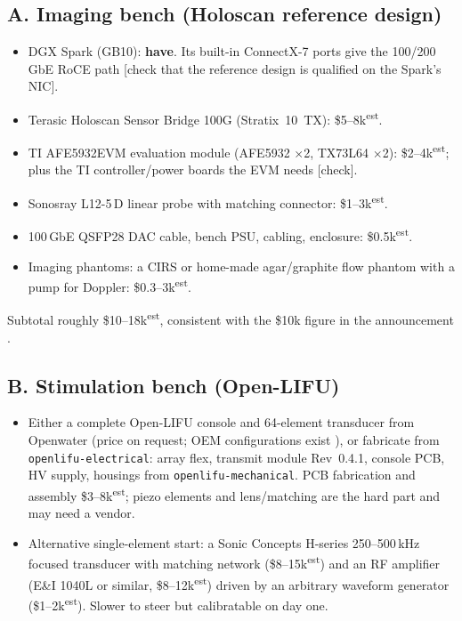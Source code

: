 \documentclass[11pt,a4paper]{article}
\newcommand{\todo}[1]{\textcolor{red!70!black}{[#1]}}
\newcommand{\est}{\textsuperscript{est}}
\begin{document}
\subsection*{A. Imaging bench (Holoscan reference design)}
\begin{itemize}[leftmargin=*,nosep]
\item DGX Spark (GB10): \textbf{have}. Its built-in ConnectX-7 ports give the 100/200\,GbE RoCE path \todo{check that the reference design is qualified on the Spark's NIC}.
\item Terasic Holoscan Sensor Bridge 100G (Stratix~10~TX): \$5--8k\est.
\item TI AFE5932EVM evaluation module (AFE5932 $\times$2, TX73L64 $\times$2): \$2--4k\est; plus the TI controller/power boards the EVM needs \todo{check}.
\item Sonosray L12-5\,D linear probe with matching connector: \$1--3k\est.
\item 100\,GbE QSFP28 DAC cable, bench PSU, cabling, enclosure: \$0.5k\est.
\item Imaging phantoms: a CIRS or home-made agar/graphite flow phantom with a pump for Doppler: \$0.3--3k\est.
\end{itemize}
Subtotal roughly \$10--18k\est, consistent with the \$10k figure in the announcement \cite{simson2026}.

\subsection*{B. Stimulation bench (Open-LIFU)}
\begin{itemize}[leftmargin=*,nosep]
\item Either a complete Open-LIFU console and 64-element transducer from Openwater (price on request; OEM configurations exist \cite{openlifu}), or fabricate from \texttt{openlifu-electrical}: array flex, transmit module Rev~0.4.1, console PCB, HV supply, housings from \texttt{openlifu-mechanical}. PCB fabrication and assembly \$3--8k\est; piezo elements and lens/matching are the hard part and may need a vendor.
\item Alternative single-element start: a Sonic Concepts H-series 250--500\,kHz focused transducer with matching network (\$8--15k\est) and an RF amplifier (E\&I 1040L or similar, \$8--12k\est) driven by an arbitrary waveform generator (\$1--2k\est). Slower to steer but calibratable on day one.
\end{itemize}
\end{document}
